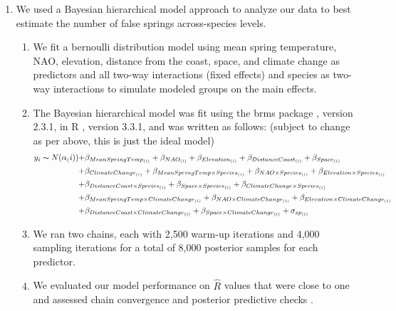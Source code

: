 \documentclass{article}\usepackage[]{graphicx}\usepackage[]{color}
\begin{document}
\begin{enumerate}
\item We used a Bayesian hierarchical model approach to analyze our data to best estimate the number of false springs across-species levels. 
\begin{enumerate}
\item We fit a bernoulli distribution model using mean spring temperature, NAO, elevation, distance from the coast, space, and climate change as predictors and all two-way interactions (fixed effects) and species as two-way interactions to simulate modeled groups on the main effects.
\item The Bayesian hierarchical model was fit using the brms package \citep{brms}, version 2.3.1,  in R \citep{R}, version 3.3.1, and was written as follows: (subject to change as per above, this is just the ideal model)
\begin{align*} \label{eq:1} %
y_i \thicksim N(\alpha_(i)) +& \beta_{MeanSpringTemp_{(i)}} + \beta_{NAO_{(i)}}+ \beta_{Elevation_{(i)}} + \beta_{DistanceCoast_{(i)}} + \beta_{Space_{(i)}} \\ +& \beta_{ClimateChange_{(i)}}
+ \beta_{MeanSpringTemp \times Species_{(i)}} + \beta_{NAO \times Species_{(i)}}+ \beta_{Elevation \times Species_{(i)}} \\ +& \beta_{DistanceCoast \times Species_{(i)}} + \beta_{Space \times Species_{(i)}} + \beta_{ClimateChange \times Species_{(i)}} \\
+& \beta_{MeanSpringTemp \times ClimateChange_{(i)}} + \beta_{NAO \times ClimateChange_{(i)}}
+ \beta_{Elevation \times ClimateChange_{(i)}} \\ +& \beta_{DistanceCoast \times ClimateChange_{(i)}} + \beta_{Space \times ClimateChange_{(i)}} + \sigma_{sp_{(i)}} 
\end{align*}
\item We ran two chains, each with 2,500 warm-up iterations and 4,000 sampling iterations for a total of 8,000 posterior samples for each predictor. 
\item We evaluated our model performance on $\hat{R}$ values that were close to one and assessed chain convergence and posterior predictive checks \citep{Gelman2006}.
\end{enumerate}
\end{enumerate}
\end{document}
